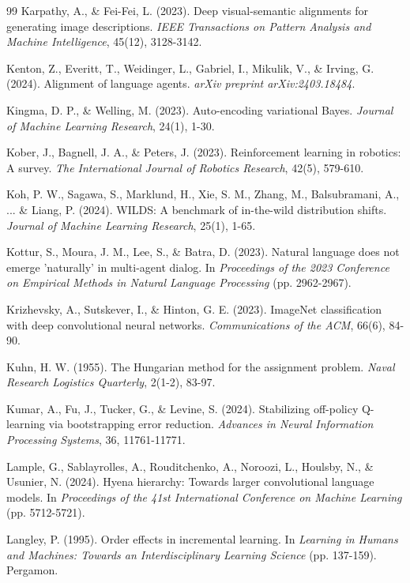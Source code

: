 \begin{thebibliography}{99}
Karpathy, A., \& Fei-Fei, L. (2023). Deep visual-semantic alignments for generating image descriptions. \textit{IEEE Transactions on Pattern Analysis and Machine Intelligence}, 45(12), 3128-3142.

Kenton, Z., Everitt, T., Weidinger, L., Gabriel, I., Mikulik, V., \& Irving, G. (2024). Alignment of language agents. \textit{arXiv preprint arXiv:2403.18484}.

Kingma, D. P., \& Welling, M. (2023). Auto-encoding variational Bayes. \textit{Journal of Machine Learning Research}, 24(1), 1-30.

Kober, J., Bagnell, J. A., \& Peters, J. (2023). Reinforcement learning in robotics: A survey. \textit{The International Journal of Robotics Research}, 42(5), 579-610.

Koh, P. W., Sagawa, S., Marklund, H., Xie, S. M., Zhang, M., Balsubramani, A., ... \& Liang, P. (2024). WILDS: A benchmark of in-the-wild distribution shifts. \textit{Journal of Machine Learning Research}, 25(1), 1-65.

Kottur, S., Moura, J. M., Lee, S., \& Batra, D. (2023). Natural language does not emerge 'naturally' in multi-agent dialog. In \textit{Proceedings of the 2023 Conference on Empirical Methods in Natural Language Processing} (pp. 2962-2967).

Krizhevsky, A., Sutskever, I., \& Hinton, G. E. (2023). ImageNet classification with deep convolutional neural networks. \textit{Communications of the ACM}, 66(6), 84-90.

Kuhn, H. W. (1955). The Hungarian method for the assignment problem. \textit{Naval Research Logistics Quarterly}, 2(1-2), 83-97.

Kumar, A., Fu, J., Tucker, G., \& Levine, S. (2024). Stabilizing off-policy Q-learning via bootstrapping error reduction. \textit{Advances in Neural Information Processing Systems}, 36, 11761-11771.

Lample, G., Sablayrolles, A., Rouditchenko, A., Noroozi, L., Houlsby, N., \& Usunier, N. (2024). Hyena hierarchy: Towards larger convolutional language models. In \textit{Proceedings of the 41st International Conference on Machine Learning} (pp. 5712-5721).

Langley, P. (1995). Order effects in incremental learning. In \textit{Learning in Humans and Machines: Towards an Interdisciplinary Learning Science} (pp. 137-159). Pergamon.


\end{thebibliography}
